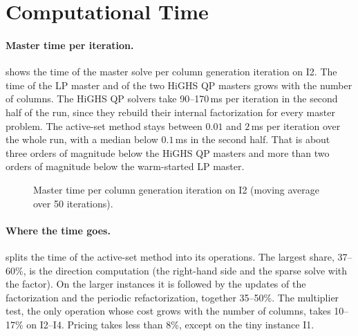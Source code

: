 \section{Computational Time}
\label{sec:results-time}

\paragraph{Master time per iteration.}  shows the time of the master
solve per column generation iteration on I2. The time of the LP master and of the two HiGHS QP
masters grows with the number of columns. The HiGHS QP solvers take 90--170\,ms per
iteration in the second half of the run, since they rebuild their internal factorization for
every master problem. The active-set method stays between $0.01$ and $2$\,ms per iteration
over the whole run, with a median below $0.1$\,ms in the second half. That is about three orders
of magnitude below the HiGHS QP masters and more than two orders of magnitude below the
warm-started LP master.

\begin{figure}[ht]
\centering
{}
\caption{Master time per column generation iteration on I2 (moving average over 50
iterations).}
\label{fig:master-time}
\end{figure}

\paragraph{Where the time goes.}  splits the time of the active-set
method into its operations. The largest share, 37--60\%, is the direction computation (the
right-hand side and the sparse solve with the factor). On the larger instances it is followed
by the updates of the factorization and the periodic refactorization, together 35--50\%. The
multiplier test, the only operation whose cost grows with the number of columns, takes
10--17\% on I2--I4. Pricing takes less than 8\%, except on the tiny instance I1.

